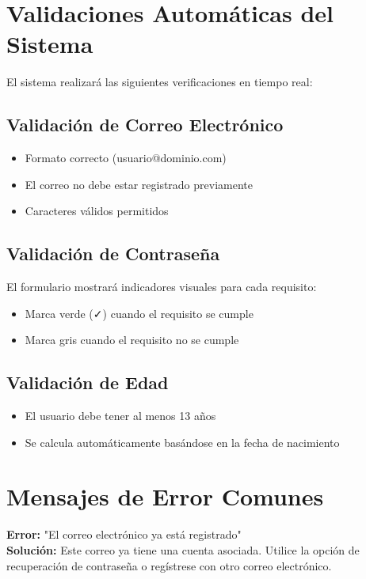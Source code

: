 \documentclass[11pt,a4paper,twoside]{book}
\begin{document}
\section{Validaciones Automáticas del Sistema}

El sistema realizará las siguientes verificaciones en tiempo real:

\subsection{Validación de Correo Electrónico}
\begin{itemize}
    \item Formato correcto (usuario@dominio.com)
    \item El correo no debe estar registrado previamente
    \item Caracteres válidos permitidos
\end{itemize}

\subsection{Validación de Contraseña}
El formulario mostrará indicadores visuales para cada requisito:
\begin{itemize}
    \item Marca verde (\textcolor{maratonsuccess}{\faCheck}) cuando el requisito se cumple
    \item Marca gris cuando el requisito no se cumple
\end{itemize}

\subsection{Validación de Edad}
\begin{itemize}
    \item El usuario debe tener al menos 13 años
    \item Se calcula automáticamente basándose en la fecha de nacimiento
\end{itemize}

\section{Mensajes de Error Comunes}

\begin{errorbox}
\textbf{Error:} "El correo electrónico ya está registrado"\\
\textbf{Solución:} Este correo ya tiene una cuenta asociada. Utilice la opción de recuperación de contraseña o regístrese con otro correo electrónico.
\end{errorbox}
\end{document}
